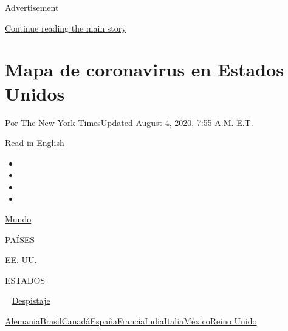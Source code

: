 Advertisement

\protect\hyperlink{after-top}{Continue reading the main story}

\hypertarget{mapa-de-coronavirus-en-estados-unidos}{%
\section{Mapa de coronavirus en Estados
Unidos}\label{mapa-de-coronavirus-en-estados-unidos}}

Por The New York TimesUpdated August 4, 2020, 7:55 A.M. E.T.

\href{https://www.nytimes.com/interactive/2020/us/coronavirus-us-cases.html}{Read
in English}

\begin{itemize}
\item
\item
\item
\item
\end{itemize}

\href{https://www.nytimes.com/interactive/2020/world/coronavirus-maps.html}{Mundo}~

PAÍSES

\textbar{}
\href{https://www.nytimes.com/es/interactive/2020/espanol/mundo/coronavirus-en-estados-unidos.html}{EE.
UU.}~

ESTADOS

~
\href{https://www.nytimes.com/interactive/2020/us/coronavirus-testing.html}{Despistaje}

\href{https://www.nytimes.com/interactive/2020/world/europe/germany-coronavirus-cases.html}{Alemania}\href{https://www.nytimes.com/interactive/2020/world/americas/brazil-coronavirus-cases.html}{Brasil}\href{https://www.nytimes.com/interactive/2020/world/canada/canada-coronavirus-cases.html}{Canadá}\href{https://www.nytimes.com/interactive/2020/world/europe/spain-coronavirus-cases.html}{España}\href{https://www.nytimes.com/interactive/2020/world/europe/france-coronavirus-cases.html}{Francia}\href{https://www.nytimes.com/interactive/2020/world/asia/india-coronavirus-cases.html}{India}\href{https://www.nytimes.com/interactive/2020/world/europe/italy-coronavirus-cases.html}{Italia}\href{https://www.nytimes.com/es/interactive/2020/espanol/america-latina/coronavirus-en-mexico.html}{México}\href{https://www.nytimes.com/interactive/2020/world/europe/united-kingdom-coronavirus-cases.html}{Reino
Unido}

